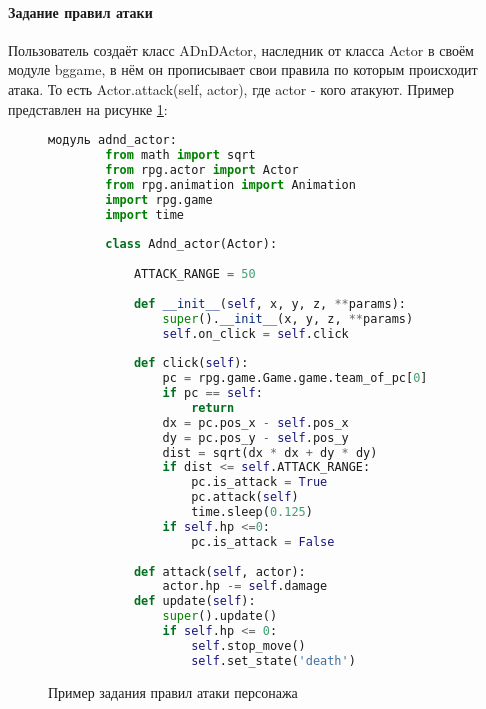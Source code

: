 \paragraph{Задание правил атаки}
Пользователь создаёт класс ADnDActor, наследник от класса Actor в своём модуле bggame, в нём он прописывает свои правила по которым происходит атака. То есть Actor.attack(self, actor), где actor - кого атакуют.
Пример представлен на рисунке \ref{attack:image}:
\begin{figure}[H]
	\begin{lstlisting}[language=Python]
		модуль adnd_actor:
		from math import sqrt
		from rpg.actor import Actor
		from rpg.animation import Animation
		import rpg.game
		import time
		
		class Adnd_actor(Actor):
		
			ATTACK_RANGE = 50
		
			def __init__(self, x, y, z, **params):
				super().__init__(x, y, z, **params)
				self.on_click = self.click
			
			def click(self):
				pc = rpg.game.Game.game.team_of_pc[0]
				if pc == self:
					return
				dx = pc.pos_x - self.pos_x
				dy = pc.pos_y - self.pos_y
				dist = sqrt(dx * dx + dy * dy)
				if dist <= self.ATTACK_RANGE:
					pc.is_attack = True
					pc.attack(self)
					time.sleep(0.125)
				if self.hp <=0:
					pc.is_attack = False
		
			def attack(self, actor):
				actor.hp -= self.damage
			def update(self):
				super().update()
				if self.hp <= 0:
					self.stop_move()
					self.set_state('death')
\end{lstlisting}  
\caption{Пример задания правил атаки персонажа}
\label{attack:image}
\end{figure}


